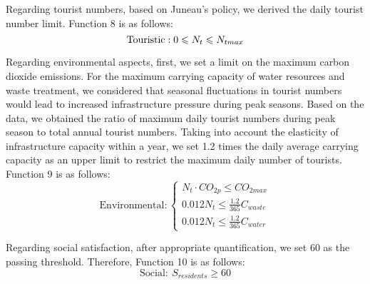 \documentclass[12pt]{article}  %
\begin{document}
Regarding tourist numbers, based on Juneau's policy\cite{7}, we derived the daily tourist number limit. Function 8 is as follows:
\begin{equation}
	\text{Touristic}:
		0\leqslant N_{t}\leqslant N_{tmax}\\
\end{equation}

Regarding environmental aspects, first, we set a limit on the maximum carbon dioxide emissions. For the maximum carrying capacity of water resources and waste treatment, we considered that seasonal fluctuations in tourist numbers would lead to increased infrastructure pressure during peak seasons. Based on the data, we obtained the ratio of maximum daily tourist numbers during peak season to total annual tourist numbers. Taking into account the elasticity of infrastructure capacity within a year, we set 1.2 times the daily average carrying capacity as an upper limit to restrict the maximum daily number of tourists. Function 9 is as follows:
\begin{equation}
	\text{Environmental}:
	\begin{cases}
		N_{t}\cdot CO_{2p}\leqslant CO_{2max} \\
		0.012N_t\leqslant \frac{1.2}{365}C_{waste} \\
		0.012N_t\leqslant \frac{1.2}{365}C_{water}
	\end{cases}
\end{equation}

Regarding social satisfaction, after appropriate quantification, we set 60 as the passing threshold. Therefore, Function 10 is as follows:
\begin{equation}
	\text{Social}:\ S_{residents} \geqslant 60
\end{equation}	
\end{document}
